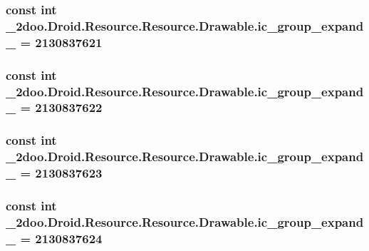 \hypertarget{class__2doo_1_1_droid_1_1_resource_1_1_drawable_22f9271f8f8af73d1778abfbf16d2596}{
\subsubsection[{ic\_\-group\_\-expand\_\-06}]{\setlength{\rightskip}{0pt plus 5cm}const int \_\-2doo.Droid.Resource.Resource.Drawable.ic\_\-group\_\-expand\_ = 2130837621}}
\label{class__2doo_1_1_droid_1_1_resource_1_1_drawable_22f9271f8f8af73d1778abfbf16d2596}


\hypertarget{class__2doo_1_1_droid_1_1_resource_1_1_drawable_464cee28d4bf7edb04b7564894227078}{
\subsubsection[{ic\_\-group\_\-expand\_\-07}]{\setlength{\rightskip}{0pt plus 5cm}const int \_\-2doo.Droid.Resource.Resource.Drawable.ic\_\-group\_\-expand\_ = 2130837622}}
\label{class__2doo_1_1_droid_1_1_resource_1_1_drawable_464cee28d4bf7edb04b7564894227078}


\hypertarget{class__2doo_1_1_droid_1_1_resource_1_1_drawable_4fd786854e80c48b71c06eb9a4e1a52d}{
\subsubsection[{ic\_\-group\_\-expand\_\-08}]{\setlength{\rightskip}{0pt plus 5cm}const int \_\-2doo.Droid.Resource.Resource.Drawable.ic\_\-group\_\-expand\_ = 2130837623}}
\label{class__2doo_1_1_droid_1_1_resource_1_1_drawable_4fd786854e80c48b71c06eb9a4e1a52d}


\hypertarget{class__2doo_1_1_droid_1_1_resource_1_1_drawable_6f66d0963ac39161e6d8348e10b37883}{
\subsubsection[{ic\_\-group\_\-expand\_\-09}]{\setlength{\rightskip}{0pt plus 5cm}const int \_\-2doo.Droid.Resource.Resource.Drawable.ic\_\-group\_\-expand\_ = 2130837624}}
\label{class__2doo_1_1_droid_1_1_resource_1_1_drawable_6f66d0963ac39161e6d8348e10b37883}


